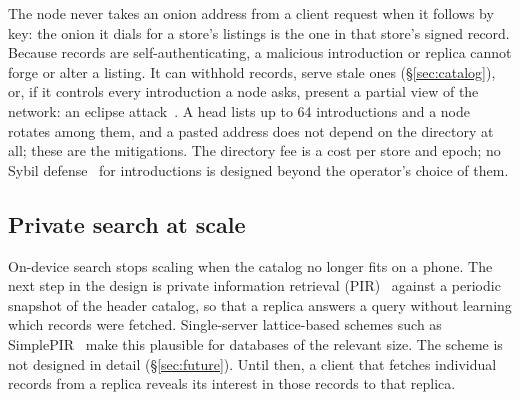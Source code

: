 The node never takes an onion address from a client request when it follows by key: the onion it dials for a store's listings is the one in that store's signed record. Because records are self-authenticating, a malicious introduction or replica cannot forge or alter a listing. It can withhold records, serve stale ones (\S\ref{sec:catalog}), or, if it controls every introduction a node asks, present a partial view of the network: an eclipse attack~\citep{heilman2015eclipse}. A head lists up to 64 introductions and a node rotates among them, and a pasted address does not depend on the directory at all; these are the mitigations. The directory fee is a cost per store and epoch; no Sybil defense~\citep{douceur2002sybil} for introductions is designed beyond the operator's choice of them.

\subsection{Private search at scale}

On-device search stops scaling when the catalog no longer fits on a phone. The next step in the design is private information retrieval (PIR)~\citep{chor1995pir} against a periodic snapshot of the header catalog, so that a replica answers a query without learning which records were fetched. Single-server lattice-based schemes such as SimplePIR~\citep{henzinger2023simplepir} make this plausible for databases of the relevant size. The scheme is not designed in detail (\S\ref{sec:future}). Until then, a client that fetches individual records from a replica reveals its interest in those records to that replica.
